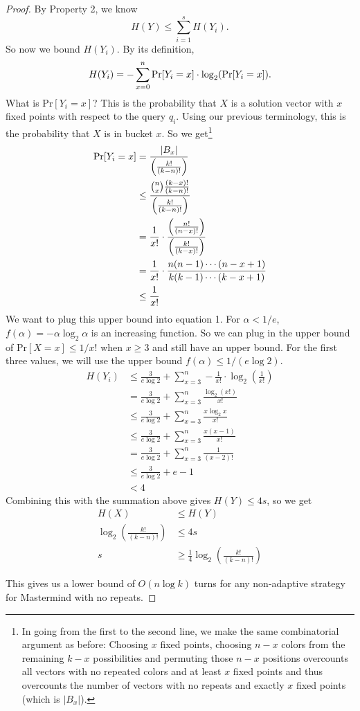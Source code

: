 \documentclass[12pt, a4paper]{article}
\begin{document}
\begin{proof}
By Property 2, we know
    \begin{equation*}
    H(Y) \leq \sum_{i=1}^s H(Y_i).
    \end{equation*}
So now we bound $H(Y_i)$. By its definition,
    \begin{equation}
    H(Y_i)=-\sum_{x=0}^n \textnormal{Pr}[Y_i=x]\cdot\log_2(\textnormal{Pr}[Y_{i}=x]).
    \end{equation}
What is Pr$[Y_i = x]$? This is the probability that $X$ is a solution vector with $x$
fixed points with respect to the query $q_i$. Using our previous terminology, this is
the probability that $X$ is in bucket $x$.
So we get\footnote{In going from the first to the second line,
we make the same combinatorial argument as before:
Choosing $x$ fixed points, choosing $n-x$ colors from the remaining $k-x$ possibilities
and permuting those $n-x$ positions overcounts all vectors with no repeated colors
and at least $x$ fixed points and thus overcounts the number of vectors with no
repeats and exactly $x$ fixed points (which is $|B_x|$).}
	\begin{align*}
	\textnormal{Pr}[Y_i = x] &= \frac{|B_x|}{\left(\frac{k!}{(k-n)!}\right)}\\
	&\leq \frac{\binom{n}{x}\frac{(k-x)!}{(k-n)!}}{\left(\frac{k!}{(k-n)!}\right)}\\
	& = \frac{1}{x!}\cdot
	\frac{\left(\frac{n!}{(n-x)!}\right)}{\left(\frac{k!}{(k-x)!}\right)}\\
	&= \frac{1}{x!}\cdot\frac{n(n-1)\cdots(n-x+1)}{k(k-1)\cdots(k-x+1)}\\
	&\leq \frac{1}{x!}
	\end{align*}
\clearpage
We want to plug this upper bound into equation 1.
For $\alpha<1/e$, $f(\alpha)=-\alpha\log_2\alpha$ is an increasing function.
So we can plug in the upper bound of $\text{Pr}[X=x]\le 1/x!$ when $x\ge 3$ and
still have an upper bound. For the first three values, we will use the upper bound
$f(\alpha)\le 1/(e\log 2)$. 
    \begin{align*}
    H(Y_i) &\leq \frac{3}{e\log 2}+\sum_{x=3}^n-\frac{1}{x!}\cdot\log_2(\frac{1}{x!})\\
    &= \frac{3}{e\log 2}+\sum_{x=3}^n \frac{\log_2(x!)}{x!}\\
    &\leq \frac{3}{e\log 2}+\sum_{x=3}^n \frac{x \log_2 x}{x!}\\
    &\leq \frac{3}{e\log 2}+\sum_{x=3}^n \frac{x (x-1)}{x!}\\
    &= \frac{3}{e\log 2}+\sum_{x=3}^n \frac{1}{(x-2)!}\\
    &\leq \frac{3}{e\log 2}+e-1\\
    & < 4
    \end{align*}
Combining this with the summation above gives $H(Y) \leq 4s$, so we get
	\begin{align*}
	H(X) &\leq H(Y)\\
	\log_2\left(\frac{k!}{(k-n)!}\right) &\leq 4s\\
	s &\geq \frac{1}{4}\log_2\left(\frac{k!}{(k-n)!}\right)
	\end{align*}

This gives us a lower bound of $O(n \log k)$ turns for any non-adaptive strategy for
Mastermind with no repeats.
\end{proof}
\end{document}
